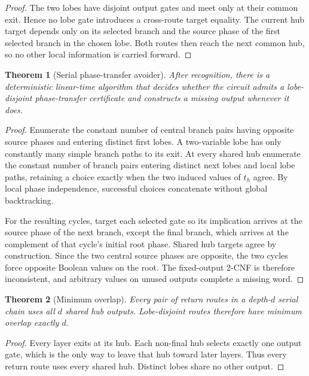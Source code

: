 \documentclass[11pt]{article}
\newtheorem{theorem}{Theorem}
\begin{document}
\begin{proof}
The two lobes have disjoint output gates and meet only at their common exit.  Hence no
lobe gate introduces a cross-route target equality.  The current hub target depends
only on its selected branch and the source phase of the first selected branch in the
chosen lobe.  Both routes then reach the next common hub, so no other local information
is carried forward.
\end{proof}

\begin{theorem}[Serial phase-transfer avoider]
After recognition, there is a deterministic linear-time algorithm that decides whether
the circuit admits a lobe-disjoint phase-transfer certificate and constructs a missing
output whenever it does.
\end{theorem}

\begin{proof}
Enumerate the constant number of central branch pairs having opposite source phases and
entering distinct first lobes.  A two-variable lobe has only constantly many simple
branch paths to its exit.  At every shared hub enumerate the constant number of branch
pairs entering distinct next lobes and local lobe paths, retaining a choice exactly
when the two induced values of $t_h$ agree.  By local phase independence, successful
choices concatenate without global backtracking.

For the resulting cycles, target each selected gate so its implication arrives at the
source phase of the next branch, except the final branch, which arrives at the
complement of that cycle's initial root phase.  Shared hub targets agree by
construction.  Since the two central source phases are opposite, the two cycles force
opposite Boolean values on the root.  The fixed-output 2-CNF is therefore inconsistent,
and arbitrary values on unused outputs complete a missing word.
\end{proof}

\begin{theorem}[Minimum overlap]
Every pair of return routes in a depth-$d$ serial chain uses all $d$ shared hub outputs.
Lobe-disjoint routes therefore have minimum overlap exactly $d$.
\end{theorem}

\begin{proof}
Every layer exits at its hub.  Each non-final hub selects exactly one output gate, which
is the only way to leave that hub toward later layers.  Thus every return route uses
every shared hub.  Distinct lobes share no other output.
\end{proof}
\end{document}
